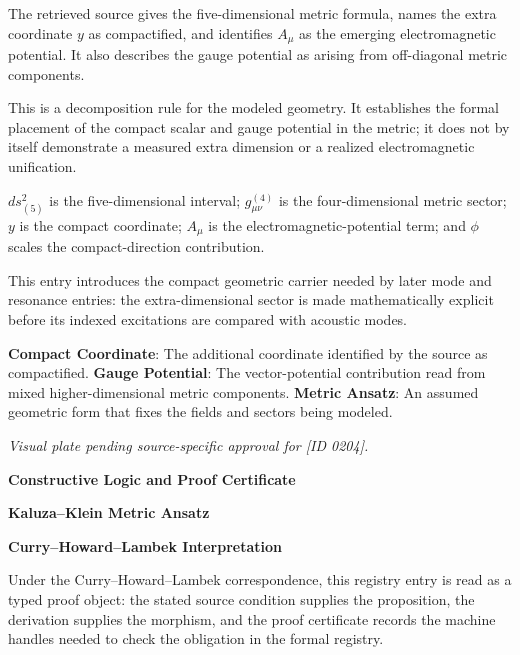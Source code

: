 
The retrieved source gives the five-dimensional metric formula, names the extra coordinate \(y\) as compactified, and identifies \(A_{\mu}\) as the emerging electromagnetic potential. It also describes the gauge potential as arising from off-diagonal metric components.


This is a decomposition rule for the modeled geometry. It establishes the formal placement of the compact scalar and gauge potential in the metric; it does not by itself demonstrate a measured extra dimension or a realized electromagnetic unification.


\(ds^2_{(5)}\) is the five-dimensional interval; \(g^{(4)}_{\mu\nu}\) is the four-dimensional metric sector; \(y\) is the compact coordinate; \(A_{\mu}\) is the electromagnetic-potential term; and \(\phi\) scales the compact-direction contribution.


This entry introduces the compact geometric carrier needed by later mode and resonance entries: the extra-dimensional sector is made mathematically explicit before its indexed excitations are compared with acoustic modes.


\noindent \textbf{Compact Coordinate}: The additional coordinate identified by the source as compactified. \enspace\textbullet\enspace \textbf{Gauge Potential}: The vector-potential contribution read from mixed higher-dimensional metric components. \enspace\textbullet\enspace \textbf{Metric Ansatz}: An assumed geometric form that fixes the fields and sectors being modeled.\par

\endgroup

\begingroup\footnotesize\itshape
Visual plate pending source-specific approval for [ID 0204].
\par\endgroup

\clearpage
\begingroup\tzpsupportsetup
\noindent\textbf{\fontsize{10.8pt}{12.8pt}\selectfont [ID 0204] Constructive Logic and Proof Certificate}\par
\noindent\textbf{\fontsize{10pt}{12pt}\selectfont Kaluza--Klein Metric Ansatz}\par
\vspace{0.45em}
\begingroup
\footnotesize
\setlength{\parskip}{0.22em}
\setlength{\parindent}{0pt}
\noindent\textbf{Curry--Howard--Lambek Interpretation}\par
Under the Curry--Howard--Lambek correspondence, this registry entry is read as a typed proof
object: the stated source condition supplies the proposition, the derivation supplies the
morphism, and the proof certificate records the machine handles needed to check the obligation
in the formal registry.

